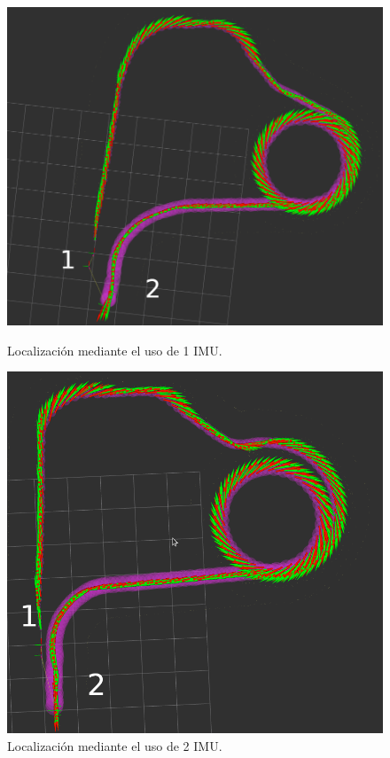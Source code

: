 \begin{figure}[htbp]
  \centering
  \begin{minipage}[b]{0.45\textwidth}
    \centering
    \includegraphics[width=\textwidth]{images/1_imu_final.png}
    \caption{Localización mediante el uso de 1 IMU.}
    \label{fig:Localización_1imu}
  \end{minipage}
  \hfill
  \begin{minipage}[b]{0.4\textwidth}
    \centering
    \includegraphics[width=\textwidth]{images/2_imu_final.png}
    \caption{Localización mediante el uso de 2 IMU.}
    \label{fig:localizacion_2imu}
  \end{minipage}
\end{figure}


